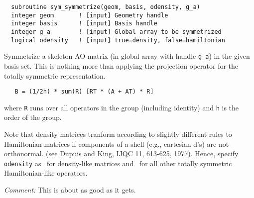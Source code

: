 \begin{verbatim}
  subroutine sym_symmetrize(geom, basis, odensity, g_a)
  integer geom       ! [input] Geometry handle
  integer basis      ! [input] Basis handle
  integer g_a        ! [input] Global array to be symmetrized
  logical odensity   ! [input] true=density, false=hamiltonian
\end{verbatim}
Symmetrize a skeleton AO matrix (in global array with handle
\verb+g_a+) in the given basis set.  This is nothing more than
applying the projection operator for the totally symmetric
representation.
\begin{verbatim}
   B = (1/2h) * sum(R) [RT * (A + AT) * R]
\end{verbatim}
where \verb+R+ runs over all operators in the group (including
identity) and \verb+h+ is the order of the group.

Note that density matrices tranform according to slightly different
rules to Hamiltonian matrices if components of a shell (e.g.,
cartesian d's) are not orthonormal.  (see Dupuis and King, IJQC 11,
613-625, 1977).  Hence, specify \verb+odensity+ as \TRUE\ for
density-like matrices and \FALSE\ for all other totally symmetric
Hamiltonian-like operators.


{\em Comment:} This is about as good as it gets.
